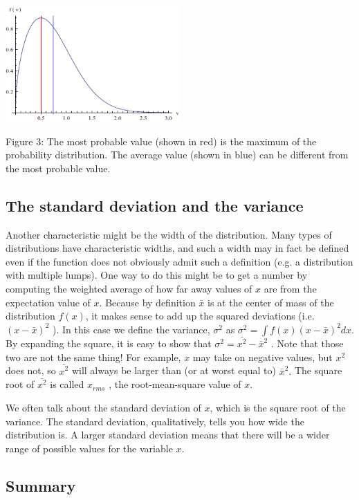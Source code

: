 \documentclass[12pt]{book}
\begin{document}
\begin{center}
 \includegraphics[width=0.5\textwidth]{AvgMax.png}
\end{center}
Figure 3: The most probable value (shown in red) is the maximum of the probability distribution. The average value (shown in blue) can be different from the most probable value.

\subsection{The standard deviation and the variance}

\noindent Another characteristic might be the width of the distribution. Many types of distributions have characteristic widths, and such a width may in fact be defined even if the function does not obviously admit such a definition (e.g. a distribution with multiple lumps). One way to do this might be to get a number by computing the weighted average of how far away values of $x$ are from the expectation value of $x$. Because by definition $\bar{x}$ is at the center of mass of the distribution $f (x)$, it makes sense to add up the squared deviations (i.e. $(x-\bar{x})^2$ ). In this case we define the variance, $\sigma^2$ as $\sigma^2 = \int f (x)(x-\bar{x})^2 dx$. By expanding the square,
it is easy to show that $\sigma^2 =\bar{x^2} - \bar{x}^2$ . Note that those two are not the same thing! For example, $x$ may take on negative values, but $x^2$ does not, so $\bar{x^2}$ will always be larger than (or at worst equal to) $\bar{x}^2.$ The square root of $\bar{x^2}$ is called $x_{rms}$ , the root-mean-square value of $x$.

 We often talk about the standard deviation of $x$, which is the square root of the variance. The standard deviation, qualitatively, tells you how wide the distribution is. A larger standard deviation means that there will be a wider range of possible values for the variable $x$.

\subsection{Summary}
\end{document}
